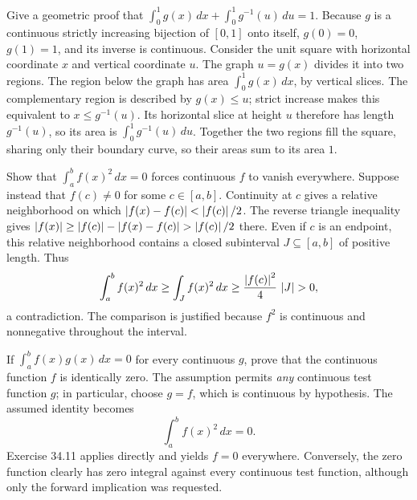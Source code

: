 \goal Give a geometric proof that
$\int_0^1g(x)\,dx+\int_0^1g^{-1}(u)\,du=1$.
Because $g$ is a continuous strictly increasing bijection of $[0,1]$
onto itself, $g(0)=0$, $g(1)=1$, and its inverse is continuous.
Consider the unit square with horizontal coordinate $x$ and vertical
coordinate $u$. The graph $u=g(x)$ divides it into two regions.
The region below the graph has area $\int_0^1g(x)\,dx$, by vertical
slices. The complementary region is described by $g(x)\le u$;
strict increase makes this equivalent to $x\le g^{-1}(u)$.
Its horizontal slice at height $u$ therefore has length $g^{-1}(u)$,
so its area is $\int_0^1g^{-1}(u)\,du$.
Together the two regions fill the square, sharing only their boundary
curve, so their areas sum to its area $1$.

\goal Show that $\int_a^b f(x)^2\,dx=0$ forces continuous $f$ to vanish everywhere.
Suppose instead that $f(c)\ne0$ for some $c\in[a,b]$.
Continuity at $c$ gives a relative neighborhood on which
$\left|f(x)-f(c)\right|<\left|f(c)\right|/2$. The reverse triangle inequality gives
$\abs{f(x)}\ge\abs{f(c)}-\abs{f(x)-f(c)}>\abs{f(c)}/2$ there.
Even if $c$ is an endpoint, this relative neighborhood contains a closed
subinterval $J\subseteq[a,b]$ of positive length. Thus
\[
 \int_a^b f(x)^2\,dx
 \ge\int_J f(x)^2\,dx
 \ge\frac{\abs{f(c)}^2}{4}\,\abs J>0,
\]
a contradiction. The comparison is justified because $f^2$ is continuous
and nonnegative throughout the interval.

\goal If $\int_a^b f(x)g(x)\,dx=0$ for every continuous $g$, prove
that the continuous function $f$ is identically zero.
The assumption permits \emph{any} continuous test function $g$;
in particular, choose $g=f$, which is continuous by hypothesis.
The assumed identity becomes
\[
 \int_a^b f(x)^2\,dx=0.
\]
Exercise 34.11 applies directly and yields $f=0$ everywhere.
Conversely, the zero function clearly has zero integral against every
continuous test function, although only the forward implication was requested.
